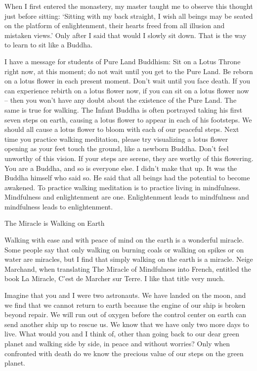 When I first entered the monastery, my master taught me to observe this thought just before sitting: ‘Sitting with my back straight, I wish all beings may be seated on the platform of enlightenment, their hearts freed from all illusion and mistaken views.’  Only after I said that would I slowly sit down.  That is the way to learn to sit like a Buddha.

I have a message for students of Pure Land Buddhism: Sit on a Lotus Throne right now, at this moment; do not wait until you get to the Pure Land.  Be reborn on a lotus flower in each present moment.  Don’t wait until you face death.  If you can experience rebirth on a lotus flower now, if you can sit on a lotus flower now – then you won’t have any doubt about the existence of the Pure Land.  The same is true for walking.  The Infant Buddha is often portrayed taking his first seven steps on earth, causing a lotus flower to appear in each of his footsteps.  We should all cause a lotus flower to bloom with each of our peaceful steps.  Next time you practice walking meditation, please try visualizing a lotus flower opening as your feet touch the ground, like a newborn Buddha.  Don’t feel unworthy of this vision.  If your steps are serene, they are worthy of this flowering.  You are a Buddha, and so is everyone else.  I didn’t make that up.  It was the Buddha himself who said so.  He said that all beings had the potential to become awakened.  To practice walking meditation is to practice living in mindfulness.  Mindfulness and enlightenment are one.  Enlightenment leads to mindfulness and mindfulness leads to enlightenment.

  

The Miracle is Walking on Earth

Walking with ease and with peace of mind on the earth is a wonderful miracle.  Some people say that only walking on burning coals or walking on spikes or on water are miracles, but I find that simply walking on the earth is a miracle.  Neige Marchand, when translating The Miracle of Mindfulness into French, entitled the book La Miracle, C’est de Marcher sur Terre.  I like that title very much.

Imagine that you and I were two astronauts.  We have landed on the moon, and we find that we cannot return to earth because the engine of our ship is broken beyond repair.  We will run out of oxygen before the control center on earth can send another ship up to rescue us.  We know that we have only two more days to live.  What would you and I think of, other than going back to our dear green planet and walking side by side, in peace and without worries?  Only when confronted with death do we know the precious value of our steps on the green planet. 

